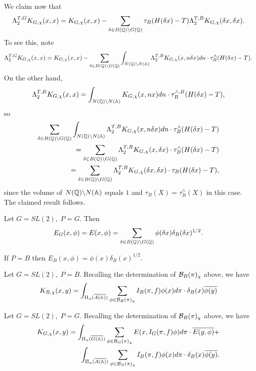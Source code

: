 \begin{example}
We claim now that 
\begin{equation}
\Lambda _2^{T,G}K_{G,\chi }(x,x)=K_{G,\chi }(x,x)-\sum_{\delta \in B({\Bbb{Q}}%
)\backslash G({\Bbb{Q}})}\tau _B(H(\delta x)-T)\Lambda _2^{T,B}K_{G,\chi
}(\delta x,\delta x).
\end{equation}
To see this, note 
\[
\Lambda _2^{T,G}K_{G,\chi }(x,x)=K_{G,\chi }(x,x)-\sum_{\delta \in B({\Bbb{Q}}%
)\backslash G({\Bbb{Q}})}\int_{N({\Bbb{Q}})\backslash N({\Bbb{A}})}\Lambda
_2^{T,B}K_{G,\chi }(x,n\delta x)dn\cdot \tau _B^{\wedge }(H(\delta x)-T).
\]
On the other hand, 
\[
\Lambda _2^{T,B}K_{G,\chi }(x,x)=\int_{N({\Bbb{Q}})\backslash N({\Bbb{A}}%
)}K_{G,\chi }(x,nx)dn\cdot \tau _B^{\wedge ,B}(H(\delta x)-T),
\]
so 
\begin{eqnarray}
\sum_{\delta \in B({\Bbb{Q}})\backslash G({\Bbb{Q}})}\int_{N({\Bbb{Q}})\backslash
N({\Bbb{A}})}\Lambda _2^{T,B}K_{G,\chi }(x,n\delta x)dn\cdot \tau _B^{\wedge
}(H(\delta x)-T)  \nonumber \\
=\sum_{\delta \in B({\Bbb{Q}})\backslash G({\Bbb{Q}})}\Lambda _2^{T,B}K_{G,\chi
}(x,\delta x)\cdot \tau _B^{\wedge }(H(\delta x)-T)  \nonumber \\
=\sum_{\delta \in B({\Bbb{Q}})\backslash G({\Bbb{Q}})}\Lambda _2^{T,B}K_{G,\chi
}(\delta x,\delta x)\cdot \tau _B(H(\delta x)-T),
\end{eqnarray}
since the volume of $N({\Bbb{Q}})\backslash N({\Bbb{A}})$
equals $1$ and $\tau _B(X)=\tau
_B^{\wedge }(X)$ in this case. The claimed result follows.
\end{example}

\begin{example}
Let $G=SL(2),\;P=G$. Then 
\[
E_G(x,\phi )
=E(x,\phi )=\sum_{\delta \in B({\Bbb{Q}})\backslash G({\Bbb{Q}})}
\phi (\delta x)\delta _B(\delta x)^{1/2}.
\]

If $P=B$ then $E_B(x,\phi )=\phi (x)\delta _B(x)^{1/2}$.
\end{example}

\begin{example}
Let $G=SL(2),\;P=B$. Recalling the determination of
${\cal{B}}_B(\pi)_\chi $ above, we have 
\[
K_{B,\chi }(x,y)
=\int_{\Pi _u(\overline{A({\Bbb{A}})})}
\sum_{\phi \in {\cal{B}}_B(\pi)_\chi }
I_B(\pi ,f)\phi (x)d\pi \cdot \delta _B(x)\overline{\phi (y)}
\]
\end{example}

\begin{example}
Let $G=SL(2),\;P=G$. Recalling the determination
of ${\cal{B}}_B(\pi)_\chi $ above, we have 
\begin{eqnarray*}
K_{G,\chi }(x,y)
=\int_{\Pi _u(\overline{G({\Bbb{A}})})}
\sum_{\phi \in {\cal{B}}_G(\pi)_\chi }
E(x,I_G(\pi ,f)\phi )d\pi \cdot \overline{E(y,\phi )}+ \\
\int_{\Pi _u(\overline{A({\Bbb{A}})})}
\sum_{\phi \in {\cal{B}}_B(\pi )_\chi }
I_B(\pi,f)\phi (x)d\pi \cdot \delta _B(x)\overline{\phi (y)}.
\end{eqnarray*}
\end{example}

